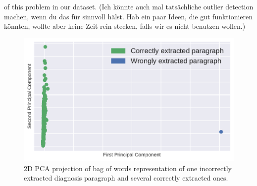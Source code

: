 of this problem in our dataset. (Ich könnte auch mal tatsächliche outlier detection machen, wenn du das für sinnvoll hälst. Hab ein paar Ideen, die gut funktionieren könnten, wollte aber keine Zeit rein stecken, falls wir es nicht benutzen wollen.)
\begin{figure}
	\includegraphics[width=\linewidth]{figures/bow_find_odd}
	\caption{2D PCA projection of bag of words representation of one incorrectly extracted diagnosis paragraph and several correctly extracted ones.}
	\label{fig:bow_find_odd}
\end{figure}

